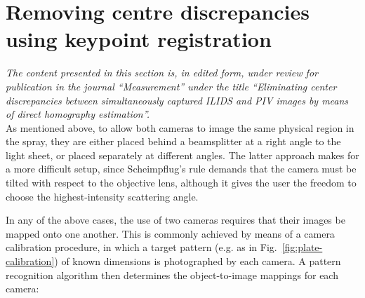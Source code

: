 \documentclass[11.5pt,oneside]{book}
\newcommand*{\figref}[1]{Fig.~\ref{#1}}
\begin{document}
\section[Removing centre discrepancies using keypoint registration]{Removing centre discrepancies\\using keypoint registration}
\label{sec:keypoint-registration}

\noindent \emph{The content presented in this section is, in edited form,
        under review for publication in the journal ``Measurement'' under the title ``Eliminating center discrepancies
between simultaneously captured ILIDS and PIV images by means of direct
homography estimation''.}\\

As mentioned above, to allow both cameras to image the same physical region in
the spray, they are either placed behind a beamsplitter at a right angle to the
light sheet, or placed separately at different angles. The latter approach makes
for a more difficult setup, since Scheimpflug's rule demands that the camera
must be tilted with respect to the objective lens, although it gives the user the
freedom to choose the highest-intensity scattering angle.

In any of the above cases, the use of two cameras requires that their images be
mapped onto one another. This is commonly achieved by means of a camera
calibration procedure, in which a target pattern (e.g. as in \figref{fig:plate-calibration}) of known dimensions is
photographed by each camera. A pattern recognition algorithm then determines the
object-to-image mappings for each camera:
\end{document}
